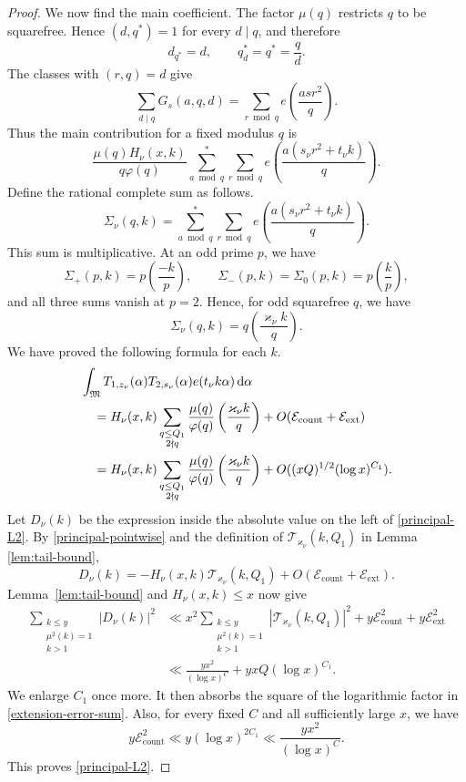 \documentclass[12pt,reqno]{amsart}
\numberwithin{equation}{section}
\theoremstyle{plain}
\theoremstyle{remark}
\newcommand{\dif}{\mathrm{d}}
\newcommand{\majorarc}{\mathfrak{M}}
\begin{document}
\begin{proof}
We now find the main coefficient.
The factor $\mu(q)$ restricts $q$ to be squarefree.  Hence
$(d,q^*)=1$ for every $d\mid q$, and therefore
\[
 d_{q^*}=d,\qquad q^*_{d}=q^*=\frac qd.
\]
The classes with $(r,q)=d$
give
\[
 \sum_{d\mid q}G_s(a,q,d)
 =\sum_{r\bmod q}e\left(\frac{asr^2}{q}\right).
\]
Thus the main contribution for a fixed modulus $q$ is
\begin{equation*}\label{fixed-q-principal-contribution}
 \frac{\mu(q)H_\nu(x,k)}{q\varphi(q)}
 \sum_{a\bmod q}^{*}\sum_{r\bmod q}
 e\left(\frac{a(s_\nu r^2+t_\nu k)}q\right).
\end{equation*}
Define the rational complete sum as follows.
\[
 \Sigma_\nu(q,k)=
 \sum_{a\bmod q}^{*}\sum_{r\bmod q}
 e\left(\frac{a(s_\nu r^2+t_\nu k)}q\right).
\]
This sum is multiplicative.  At an odd prime $p$, we have
\[
 \Sigma_+(p,k)=p\left(\frac{-k}{p}\right),\qquad
 \Sigma_-(p,k)=\Sigma_0(p,k)=p\left(\frac{k}{p}\right),
\]
and all three sums vanish at $p=2$.  Hence, for odd squarefree $q$, we
have
\[
 \Sigma_\nu(q,k)=q\left(\frac{\varkappa_\nu k}{q}\right).
\]
We have proved the following formula for each $k$.
\begin{align}
 &\int_{\majorarc}T_{1,z_\nu}(\alpha)T_{2,s_\nu}(\alpha)
 e(t_\nu k\alpha)\,\dif\alpha\notag\\
 &\quad=H_\nu(x,k)
 \sum_{\substack{q\leq Q_1\\2\nmid q}}
 \frac{\mu(q)}{\varphi(q)}
 \left(\frac{\varkappa_\nu k}{q}\right)
 +O(\mathcal E_{\mathrm{count}}+\mathcal E_{\mathrm{ext}})
 \notag\\
 &\quad=H_\nu(x,k)
 \sum_{\substack{q\leq Q_1\\2\nmid q}}
 \frac{\mu(q)}{\varphi(q)}
 \left(\frac{\varkappa_\nu k}{q}\right)
 +O((xQ)^{1/2}(\log x)^{C_1}).                 \label{principal-pointwise}
\end{align}
Let $D_\nu(k)$ be the expression inside the absolute value on the left
of \eqref{principal-L2}.
By \eqref{principal-pointwise} and the definition of
$\mathcal T_{\varkappa_\nu}(k,Q_1)$ in Lemma \ref{lem:tail-bound},
\[
 D_\nu(k)
 =-H_\nu(x,k)\mathcal T_{\varkappa_\nu}(k,Q_1)
 +O(\mathcal E_{\mathrm{count}}+\mathcal E_{\mathrm{ext}}).
\]
Lemma~\ref{lem:tail-bound} and $H_\nu(x,k)\leq x$ now give
\begin{align*}
 \sum_{\substack{k\leq y\\\mu^2(k)=1\\k>1}}|D_\nu(k)|^2
 &\ll x^2\sum_{\substack{k\leq y\\\mu^2(k)=1\\k>1}}
       |\mathcal T_{\varkappa_\nu}(k,Q_1)|^2
       +y\mathcal E_{\mathrm{count}}^2
       +y\mathcal E_{\mathrm{ext}}^2\\
 &\ll \frac{yx^2}{(\log x)^C}
       +yxQ(\log x)^{C_1}.
\end{align*}
We enlarge $C_1$ once more.  It then absorbs the square of the
logarithmic factor in \eqref{extension-error-sum}.  Also, for every
fixed $C$ and all sufficiently large $x$, we have
\[
 y\mathcal E_{\mathrm{count}}^2
 \ll y(\log x)^{2C_1}
 \ll\frac{yx^2}{(\log x)^C}.
\]
This proves \eqref{principal-L2}.
\end{proof}
\end{document}
